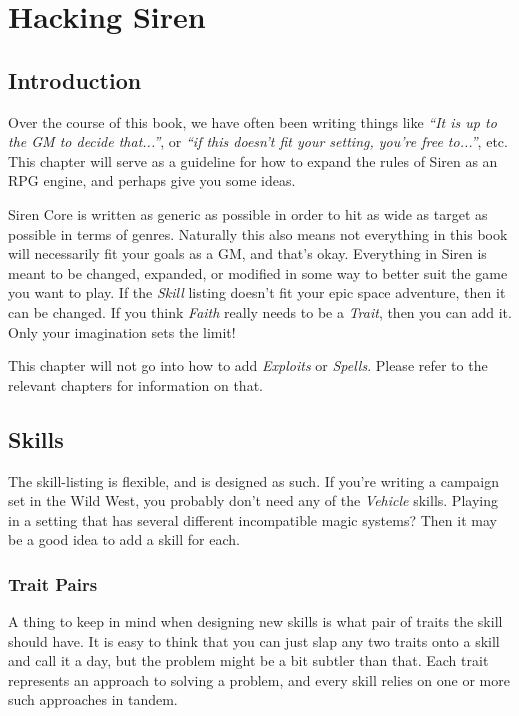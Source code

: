 \chapter{Hacking Siren}
\section{Introduction}
Over the course of this book, we have often been writing things like \textit{``It is up to the GM to decide that...''}, or \textit{``if this doesn't fit your setting, you're free to...''}, etc.
This chapter will serve as a guideline for how to expand the rules of Siren as an RPG engine, and perhaps give you some ideas.

Siren Core is written as generic as possible in order to hit as wide as target as possible in terms of genres.
Naturally this also means not everything in this book will necessarily fit your goals as a GM, and that's okay.
Everything in Siren is meant to be changed, expanded, or modified in some way to better suit the game you want to play.
If the \textit{Skill} listing doesn't fit your epic space adventure, then it can be changed.
If you think \textit{Faith} really needs to be a \textit{Trait}, then you can add it.
Only your imagination sets the limit!

\begin{note}
    This chapter will not go into how to add \textit{Exploits} or \textit{Spells}.
    Please refer to the relevant chapters for information on that.
\end{note}

\section{Skills}
The skill-listing is flexible, and is designed as such.
If you're writing a campaign set in the Wild West, you probably don't need any of the \textit{Vehicle} skills.
Playing in a setting that has several different incompatible magic systems? Then it may be a good idea to add a skill for each.

\subsection{Trait Pairs}
A thing to keep in mind when designing new skills is what pair of traits the skill should have.
It is easy to think that you can just slap any two traits onto a skill and call it a day, but the problem might be a bit subtler than that.
Each trait represents an approach to solving a problem, and every skill relies on one or more such approaches in tandem.

